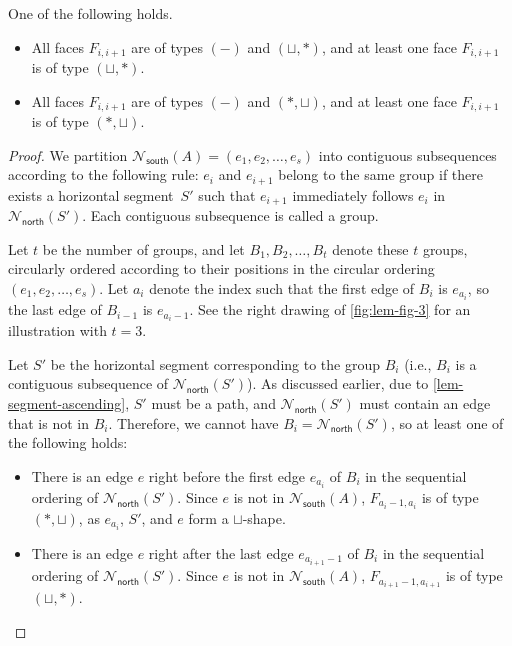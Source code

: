 \documentclass{article}\usepackage[a4paper,margin=20mm]{geometry}
\newcommand{\Nnorth}{\mathcal{N}_\mathsf{north}}
\newcommand{\Nsouth}{\mathcal{N}_\mathsf{south}}
\begin{document}
\begin{lemma}\label{lem-all-ascending}
One of the following holds.
\begin{itemize}
    \item All faces $F_{i,i+1}$ are of  types $(-)$ and $(\sqcup,\ast)$, and at least one face $F_{i,i+1}$ is of  type $(\sqcup,\ast)$.
     \item All faces $F_{i,i+1}$ are of  types $(-)$ and $(\ast,\sqcup)$, and at least one face $F_{i,i+1}$ is of  type $(\ast,\sqcup)$.
\end{itemize}
\end{lemma}
\begin{proof}
We partition $\Nsouth(A) = (e_{1}, e_{2}, \ldots, e_{s})$ into contiguous subsequences according to the following rule: $e_i$ and $e_{i+1}$ belong to the same group if there exists a horizontal segment~$S'$ such that $e_{i+1}$ immediately follows $e_i$ in $\Nnorth(S')$. Each contiguous subsequence is called a group.


Let $t$ be the number of groups, and let $B_1, B_2, \ldots, B_t$ denote these 
 $t$ groups, circularly ordered according to their positions in the circular ordering $(e_{1}, e_{2}, \ldots, e_{s})$. Let $a_i$ denote the index such that the first edge of $B_i$ is $e_{a_i}$, so the last edge of $B_{i-1}$ is $e_{a_i - 1}$. See the right drawing of \cref{fig:lem-fig-3} for an illustration with $t=3$.

Let $S'$ be the horizontal segment corresponding to the group $B_i$ (i.e., $B_i$ is a contiguous subsequence of $\Nnorth(S')$). As discussed earlier, due to \cref{lem-segment-ascending}, $S'$ must be a path, and $\Nnorth(S')$ must contain an edge that is not in $B_i$. Therefore, we cannot have $B_i = \Nnorth(S')$, so at least one of the following holds:
\begin{itemize}
    \item There is an edge $e$ right before the first edge $e_{a_i}$ of $B_i$ in the sequential ordering of $\Nnorth(S')$. 
    Since $e$ is not in $\Nsouth(A)$, $F_{a_i - 1, a_i}$ is of type $(\ast,\sqcup)$, as $e_{a_i}$, $S'$, and $e$ form a $\sqcup$-shape.
    \item There is an edge $e$ right after the last edge $e_{a_{i+1}-1}$ of $B_i$ in the sequential ordering of $\Nnorth(S')$. 
    Since $e$ is not in $\Nsouth(A)$, $F_{a_{i+1}-1, a_{i+1}}$ is of type $(\sqcup,\ast)$.
\end{itemize}






\end{proof}
\end{document}
